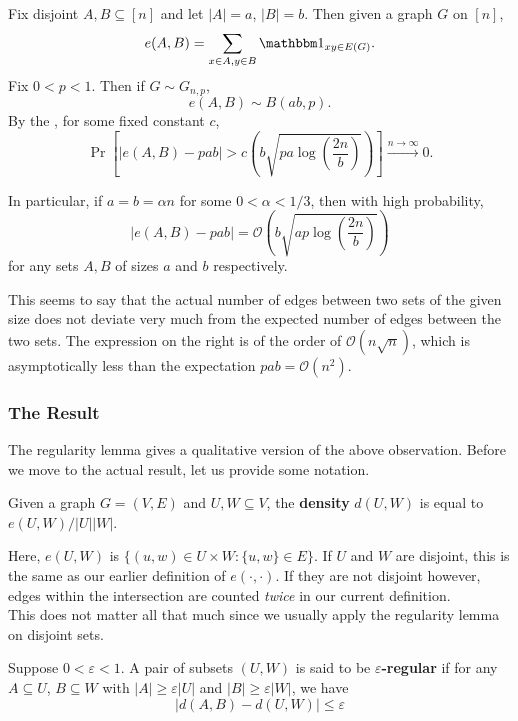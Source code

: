 			Fix disjoint $A, B \subseteq [n]$ and let $|A|=a$, $|B|=b$. Then given a graph $G$ on $[n]$,
			\[ e(A,B) = \sum_{x \in A, y \in B} \indic_{xy \in E(G)}. \]
			Fix $0<p<1$. Then if $G \sim G_{n,p}$,
			\[ e(A,B) \sim B\left( ab, p \right). \]
			By the , for some fixed constant $c$,
			\[ \Pr\left[ |e(A,B) - pab| > c \left(b\sqrt{pa\log\left(\frac{2n}{b}\right)}\right) \right] \xrightarrow{n\to\infty} 0. \]

			In particular, if $a = b = \alpha n$ for some $0 < \alpha < 1/3$, then with high probability,
			\[ |e(A,B) - pab| = \mathcal{O}\left(b\sqrt{ap\log\left(\frac{2n}{b}\right)}\right) \]
			for any sets $A, B$ of sizes $a$ and $b$ respectively.

			This seems to say that the actual number of edges between two sets of the given size does not deviate very much from the expected number of edges between the two sets. The expression on the right is of the order of $\mathcal{O}(n\sqrt{n})$, which is asymptotically less than the expectation $pab = \mathcal{O}(n^2)$.

		\subsubsection{The Result}

			The regularity lemma gives a qualitative version of the above observation. Before we move to the actual result, let us provide some notation.

			\begin{fdef}[Density]
				Given a graph $G = (V,E)$ and $U,W \subseteq V$, the \textbf{density} $d(U,W)$ is equal to $e(U,W) / |U||W|$.
			\end{fdef}

			\begin{remark}
				Here, $e(U,W)$ is $\{(u,w) \in U \times W : \{u,w\} \in E\}$. If $U$ and $W$ are disjoint, this is the same as our earlier definition of $e(\cdot,\cdot)$. If they are not disjoint however, edges within the intersection are counted \emph{twice} in our current definition.\\
				This does not matter all that much since we usually apply the regularity lemma on disjoint sets.
			\end{remark}

			\begin{fdef}
				Suppose $0 < \varepsilon < 1$. A pair of subsets $(U,W)$ is said to be \textbf{$\varepsilon$-regular} if for any $A \subseteq U$, $B\subseteq W$ with $|A| \ge \varepsilon |U|$ and $|B| \ge \varepsilon |W|$, we have
				\[ |d(A,B) - d(U,W)| \le \varepsilon \]
			\end{fdef}

